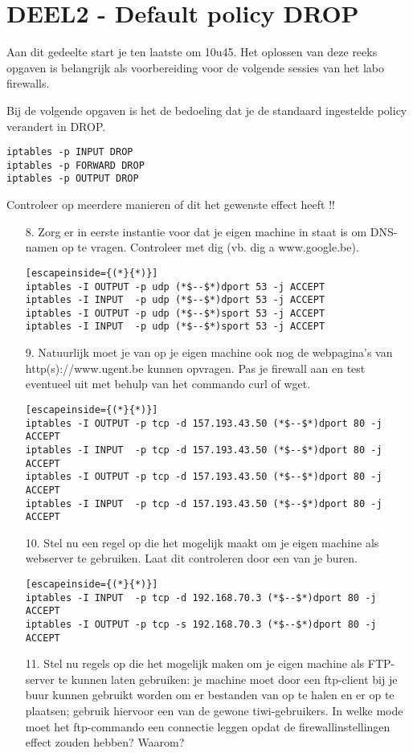 \documentclass{report}
\begin{document}
\section{DEEL2 - Default policy DROP}

Aan dit gedeelte start je ten laatste om 10u45. Het oplossen van deze reeks opgaven is belangrijk als voorbereiding voor de volgende sessies van het labo firewalls.

Bij de volgende opgaven is het de bedoeling dat je de standaard ingestelde policy verandert in DROP.
\begin{lstlisting}
iptables -p INPUT DROP
iptables -p FORWARD DROP
iptables -p OUTPUT DROP
\end{lstlisting}
Controleer op meerdere manieren of dit het gewenste effect heeft !!
\begin{enumerate}
	\item[8.]    Zorg er in eerste instantie voor dat je eigen machine in staat is om DNS-namen op te vragen. Controleer met dig (vb. dig a www.google.be).
	\begin{lstlisting}[escapeinside={(*}{*)}]
iptables -I OUTPUT -p udp (*$--$*)dport 53 -j ACCEPT
iptables -I INPUT  -p udp (*$--$*)dport 53 -j ACCEPT
iptables -I OUTPUT -p udp (*$--$*)sport 53 -j ACCEPT
iptables -I INPUT  -p udp (*$--$*)sport 53 -j ACCEPT
	\end{lstlisting}
	\item[9.]  Natuurlijk moet je van op je eigen machine ook nog de webpagina's van http(s)://www.ugent.be kunnen opvragen. Pas je firewall aan en test eventueel uit met behulp van het commando curl of wget.
	\begin{lstlisting}[escapeinside={(*}{*)}]
iptables -I OUTPUT -p tcp -d 157.193.43.50 (*$--$*)dport 80 -j ACCEPT
iptables -I INPUT  -p tcp -d 157.193.43.50 (*$--$*)dport 80 -j ACCEPT
iptables -I OUTPUT -p tcp -d 157.193.43.50 (*$--$*)dport 80 -j ACCEPT
iptables -I INPUT  -p tcp -d 157.193.43.50 (*$--$*)dport 80 -j ACCEPT
	\end{lstlisting}
	\item[10.]    Stel nu een regel op die het mogelijk maakt om je eigen machine als webserver te gebruiken. Laat dit controleren door een van je buren.
	\begin{lstlisting}[escapeinside={(*}{*)}]
iptables -I INPUT  -p tcp -d 192.168.70.3 (*$--$*)dport 80 -j ACCEPT
iptables -I OUTPUT -p tcp -s 192.168.70.3 (*$--$*)dport 80 -j ACCEPT

	\end{lstlisting}
	\item[11.]    Stel nu regels op die het mogelijk maken om je eigen machine als FTP-server te kunnen laten gebruiken: je machine moet door een ftp-client bij je buur kunnen gebruikt worden om er bestanden van op te halen en er op te plaatsen; gebruik hiervoor een van de gewone tiwi-gebruikers.
    In welke mode moet het ftp-commando een connectie leggen opdat de firewallinstellingen effect zouden hebben? Waarom?


\end{enumerate}
\end{document}
